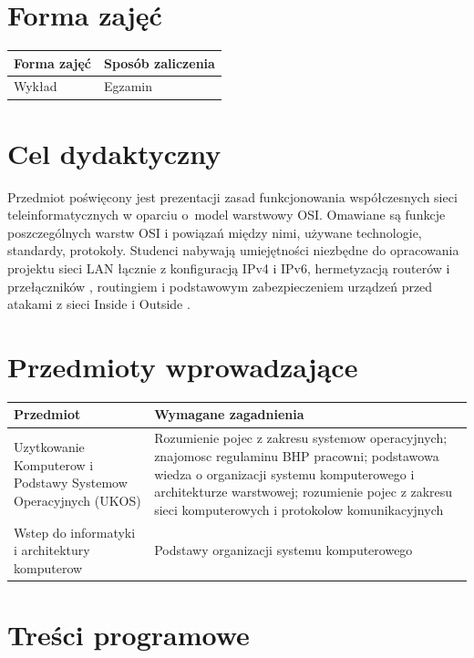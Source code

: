 \documentclass[12pt, a4paper]{article}
\begin{document}
\section{Forma zajęć}

\begin{tabular}{ll}
  \hline
  \textbf{Forma zajęć} & \textbf{Sposób zaliczenia} \\
  \hline
  Wykład & Egzamin \\
  \hline
\end{tabular}

\section{Cel dydaktyczny}

Przedmiot poświęcony jest prezentacji zasad funkcjonowania  współczesnych sieci teleinformatycznych w oparciu o model warstwowy OSI. Omawiane są funkcje poszczególnych  warstw OSI i powiązań między nimi, używane technologie, standardy, protokoły. Studenci nabywają umiejętności niezbędne do opracowania  projektu sieci LAN  łącznie z konfiguracją IPv4 i IPv6, hermetyzacją  routerów i przełączników ,  routingiem i podstawowym zabezpieczeniem urządzeń przed atakami z  sieci Inside  i Outside .

\section{Przedmioty wprowadzające}

\begin{tabularx}{\textwidth}{lX}
  \hline
  \textbf{Przedmiot} & \textbf{Wymagane zagadnienia} \\
  \hline
  Uzytkowanie Komputerow i Podstawy Systemow Operacyjnych (UKOS) & Rozumienie pojec z zakresu systemow operacyjnych; znajomosc regulaminu BHP pracowni; podstawowa wiedza o organizacji systemu komputerowego i architekturze warstwowej; rozumienie pojec z zakresu sieci komputerowych i protokolow komunikacyjnych \\
  Wstep do informatyki i architektury komputerow & Podstawy organizacji systemu komputerowego \\
  \hline
\end{tabularx}

\section{Treści programowe}
\end{document}
